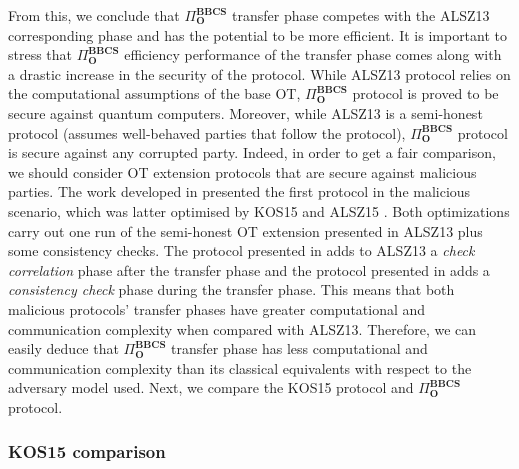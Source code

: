 

From this, we conclude that $\Pi^{\textbf{BBCS}}_{\textbf{O}}$ transfer phase competes with the ALSZ13 corresponding phase and has the potential to be more efficient. It is important to stress that $\Pi^{\textbf{BBCS}}_{\textbf{O}}$ efficiency performance of the transfer phase comes along with a drastic increase in the security of the protocol. While ALSZ13 protocol relies on the computational assumptions of the base OT, $\Pi^{\textbf{BBCS}}_{\textbf{O}}$ protocol is proved to be secure against quantum computers. Moreover, while ALSZ13 is a semi-honest protocol (assumes well-behaved parties that follow the protocol), $\Pi^{\textbf{BBCS}}_{\textbf{O}}$ protocol is secure against any corrupted party. Indeed, in order to get a fair comparison, we should consider OT extension protocols that are secure against malicious parties. The work developed in \cite{IKNP03} presented the first protocol in the malicious scenario, which was latter optimised by KOS15 \cite{KOS15} and ALSZ15 \cite{ALSZ15}. Both optimizations carry out one run of the semi-honest OT extension presented in ALSZ13 plus some consistency checks. The protocol presented in \cite{KOS15} adds to ALSZ13 a \textit{check correlation} phase after the transfer phase and the protocol presented in \cite{ALSZ15} adds a \textit{consistency check} phase during the transfer phase. This means that both malicious protocols' transfer phases have greater computational and communication complexity when compared with ALSZ13. Therefore, we can easily deduce that $\Pi^{\textbf{BBCS}}_{\textbf{O}}$ transfer phase has less computational and communication complexity than its classical equivalents with respect to the adversary model used. Next, we compare the KOS15 protocol \cite{KOS15} and $\Pi^{\textbf{BBCS}}_{\textbf{O}}$ protocol.


\subsubsection{KOS15 comparison}\label{Mal-Ext-OT_comp}

